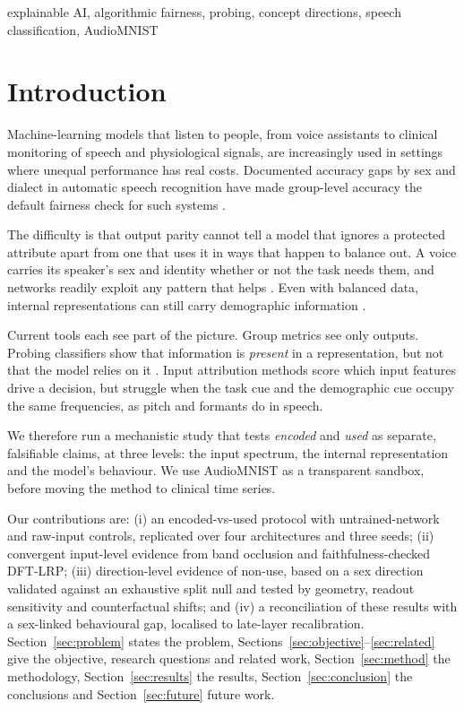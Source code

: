 \documentclass[conference]{IEEEtran}
\begin{document}
\begin{IEEEkeywords}
explainable AI, algorithmic fairness, probing, concept directions, speech
classification, AudioMNIST
\end{IEEEkeywords}

\section{Introduction}

Machine-learning models that listen to people, from voice assistants to
clinical monitoring of speech and physiological signals, are increasingly
used in settings where unequal performance has real costs. Documented
accuracy gaps by sex and dialect in automatic speech recognition
\cite{tatman2017gender,koenecke2020racial} have made group-level accuracy the
default fairness check for such systems \cite{hardt2016equality}.

The difficulty is that output parity cannot tell a model that ignores a
protected attribute apart from one that uses it in ways that happen to
balance out. A voice carries its speaker's sex and identity whether or not
the task needs them, and networks readily exploit any pattern that helps
\cite{geirhos2020shortcut}. Even with balanced data, internal
representations can still carry demographic information
\cite{wang2019balanced}.

Current tools each see part of the picture. Group metrics see only outputs.
Probing classifiers show that information is \emph{present} in a
representation, but not that the model relies on it
\cite{belinkov2022probing,hewitt2019control}. Input attribution methods
\cite{bach2015lrp,vielhaben2024virtual} score which input features drive a
decision, but struggle when the task cue and the demographic cue occupy the
same frequencies, as pitch and formants do in speech.

We therefore run a mechanistic study that tests \emph{encoded} and
\emph{used} as separate, falsifiable claims, at three levels: the input
spectrum, the internal representation and the model's behaviour. We use
AudioMNIST \cite{becker2024audiomnist} as a transparent sandbox, before
moving the method to clinical time series.

Our contributions are: (i) an encoded-vs-used protocol with untrained-network
and raw-input controls, replicated over four architectures and three seeds;
(ii) convergent input-level evidence from band occlusion and
faithfulness-checked DFT-LRP; (iii) direction-level evidence of non-use, based
on a sex direction validated against an exhaustive split null and
tested by geometry, readout sensitivity and counterfactual shifts; and (iv) a
reconciliation of these results with a sex-linked behavioural gap, localised
to late-layer recalibration. Section~\ref{sec:problem} states the problem,
Sections~\ref{sec:objective}--\ref{sec:related} give the objective, research
questions and related work, Section~\ref{sec:method} the methodology,
Section~\ref{sec:results} the results, Section~\ref{sec:conclusion} the
conclusions and Section~\ref{sec:future} future work.
\end{document}
